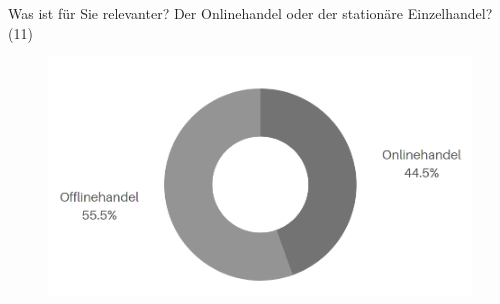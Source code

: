 \newpage\noindent Was ist für Sie relevanter? Der Onlinehandel oder der stationäre Einzelhandel? (11)\\

\begin{figure}[H]
    \begin{center}
        \includegraphics[width=12cm]{media/schuelerumfrage/11.png}
    \end{center}
\end{figure}




